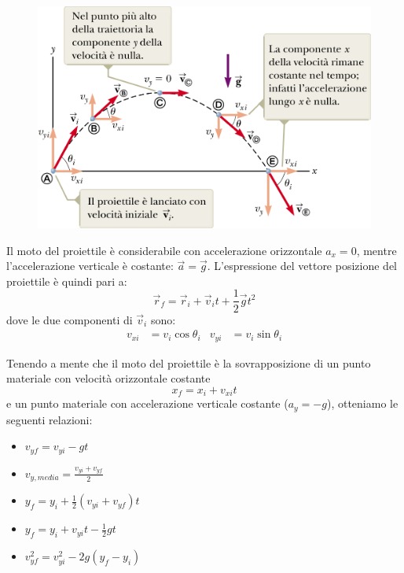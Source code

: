 \documentclass[12pt,oneside]{book}
\begin{document}
\begin{figure}[h]
    \centering
    \includegraphics[scale=0.5]{moto_proiettili}
\end{figure}

Il moto del proiettile è considerabile con accelerazione orizzontale $a_x = 0$,
mentre l'accelerazione verticale è costante: $\vec{a} = \vec{g}$. L'espressione del vettore posizione del proiettile è quindi pari a:
\begin{equation*}
    \vec{r}_f = \vec{r}_i + \vec{v}_i t + \frac{1}{2} \vec{g}t^2
\end{equation*}
dove le due componenti di $\vec{v}_i$ sono:
\begin{align*}
    v_{xi} & = v_i \cos{\theta_i} & v_{yi} & = v_i \sin{\theta_i}
\end{align*}

Tenendo a mente che il moto del proiettile è la sovrapposizione di un punto materiale con velocità orizzontale costante
\begin{equation*}
    x_f = x_i + v_{xi}t
\end{equation*}
e un punto materiale
con accelerazione verticale costante ($a_y = -g$), otteniamo le seguenti relazioni:
\begin{itemize}
    \item $v_{yf} = v_{yi} - gt$
    \item $v_{y,media} = \frac{v_{yi} + v_{yf}}{2}$
    \item $y_f = y_i + \frac{1}{2} (v_{yi} + v_{yf})t$
    \item $y_f = y_i + v_{yi}t - \frac{1}{2} gt$
    \item $v_{yf}^2 = v_{yi}^2 -2g(y_f - y_i)$
\end{itemize}
\end{document}
